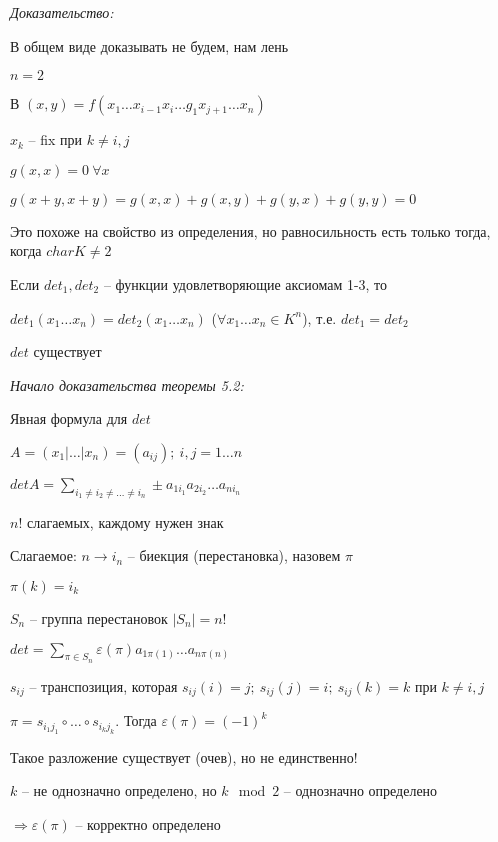 \documentclass[12pt]{article}
\begin{document}
\textit{Доказательство:}

В общем виде доказывать не будем, нам лень

$n = 2$

В $(x, y) = f(x_1 \ldots x_{i - 1}x_i \ldots g_1 x_{j + 1} \ldots x_n)$

$x_k$ -- fix при $k \neq i, j$

$g(x, x)= 0\ \forall x$

$g(x + y, x + y) = g(x, x) + g(x, y) + g(y, x) + g(y, y) = 0$

\begin{Remark}{}
    Это похоже на свойство из определения, но равносильность есть только тогда, когда $charK \neq 2$
\end{Remark}

\begin{theo}{}
    Если $det_1, det_2$ -- функции удовлетворяющие аксиомам 1-3, то 
    
    $det_1(x_1 \ldots x_n) = det_2(x_1 \ldots x_n)$ ($\forall x_1 \ldots x_n \in K^n$), т.е. $det_1 = det_2$
\end{theo}

\begin{theo}{}
    $det$ существует
\end{theo}

\textit{Начало доказательства теоремы 5.2:}

Явная формула для $det$

$A = (x_1 | \ldots | x_n) = (a_{ij});\ i, j = 1 \ldots n$

$detA = \sum\limits_{i_1 \neq i_2 \neq \ldots \neq i_n} \pm a_{1i_1} a_{2i_2} \ldots a_{ni_n}$

$n!$ слагаемых, каждому нужен знак

Слагаемое: $n \to i_n$ -- биекция (перестановка), назовем $\pi$

$\pi(k) = i_k$

$S_n$ -- группа перестановок $|S_n| = n!$

$det = \sum\limits_{\pi \in S_n} \varepsilon(\pi) a_{1\pi(1)} \ldots a_{n\pi(n)}$

$s_{ij}$ -- транспозиция, которая $s_{ij}(i) = j;\ s_{ij}(j) = i;\ s_{ij}(k) = k$ при $k \neq i, j$

$\pi = s_{i_1j_1} \circ \ldots \circ s_{i_kj_k}$. Тогда $\varepsilon(\pi) = (-1)^k$

Такое разложение существует (очев), но не единственно!

$k$ -- не однозначно определено, но $k \mod 2$ -- однозначно определено

$\Rightarrow \varepsilon(\pi)$ -- корректно определено
\end{document}
